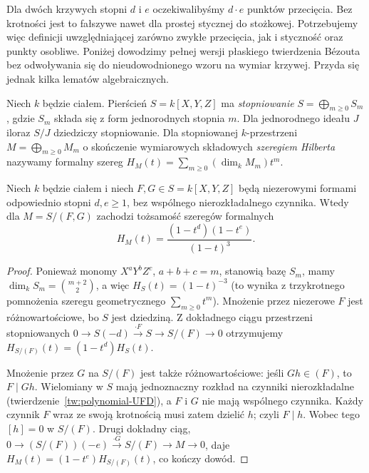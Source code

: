 Dla dwóch krzywych stopni $d$ i $e$ oczekiwalibyśmy
$d\cdot e$ punktów przecięcia. Bez krotności jest to
fałszywe nawet dla prostej stycznej do stożkowej.
Potrzebujemy więc definicji uwzględniającej zarówno
zwykłe przecięcia, jak i styczność oraz punkty osobliwe.
Poniżej dowodzimy pełnej wersji płaskiego twierdzenia Bézouta
bez odwoływania się do nieudowodnionego wzoru na wymiar krzywej.
Przyda się jednak kilka lematów algebraicznych.

\begin{definicja}
Niech $k$ będzie ciałem. Pierścień $S=k[X,Y,Z]$ ma \emph{stopniowanie}
$S=\bigoplus_{m\ge0}S_m$, gdzie $S_m$ składa się z form
jednorodnych stopnia $m$. Dla jednorodnego ideału $J$
iloraz $S/J$ dziedziczy stopniowanie.
Dla stopniowanej $k$-przestrzeni $M=\bigoplus_{m\ge0}M_m$
o skończenie wymiarowych składowych \emph{szeregiem Hilberta}
nazywamy formalny szereg
$H_M(t)=\sum_{m\ge0}(\dim_kM_m)t^m$.
\end{definicja}

\begin{stwierdzenie}
\label{st:hilbert-complete-intersection}
Niech $k$ będzie ciałem i niech $F,G\in S=k[X,Y,Z]$
będą niezerowymi formami odpowiednio stopni $d,e\ge1$,
bez wspólnego nierozkładalnego czynnika. Wtedy dla
$M=S/(F,G)$ zachodzi tożsamość szeregów formalnych
\[
 H_M(t)=\frac{(1-t^d)(1-t^e)}{(1-t)^3}.
\]
\end{stwierdzenie}
\begin{proof}
Ponieważ monomy $X^aY^bZ^c$, $a+b+c=m$, stanowią bazę
$S_m$, mamy $\dim_kS_m=\binom{m+2}{2}$, a więc
$H_S(t)=(1-t)^{-3}$ (to wynika z trzykrotnego
pomnożenia szeregu geometrycznego $\sum_{m\ge0}t^m$).
Mnożenie przez niezerowe $F$ jest różnowartościowe,
bo $S$ jest dziedziną. Z dokładnego ciągu przestrzeni
stopniowanych $0\to S(-d)\xrightarrow{\cdot F}S\to S/(F)\to0$
otrzymujemy $H_{S/(F)}(t)=(1-t^d)H_S(t)$.

Mnożenie przez $G$ na $S/(F)$ jest także różnowartościowe:
jeśli $Gh\in(F)$, to $F\mid Gh$. Wielomiany w $S$
mają jednoznaczny rozkład na czynniki nierozkładalne
(twierdzenie~\ref{tw:polynomial-UFD}),
a $F$ i $G$ nie mają wspólnego czynnika. Każdy czynnik
$F$ wraz ze swoją krotnością musi zatem dzielić $h$;
czyli $F\mid h$. Wobec tego $[h]=0$ w $S/(F)$.
Drugi dokładny ciąg,
$0\to(S/(F))(-e)\xrightarrow{\cdot G}S/(F)\to M\to0$,
daje $H_M(t)=(1-t^e)H_{S/(F)}(t)$, co kończy dowód.
\end{proof}

